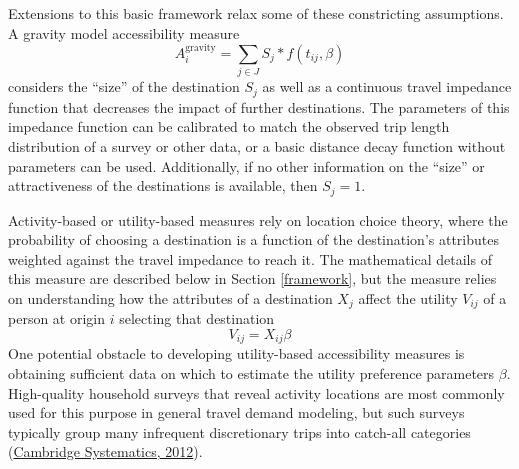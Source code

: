 \documentclass[3p, authoryear, review]{elsarticle} %
\begin{document}
Extensions to this basic framework relax some of these constricting assumptions.
A gravity model accessibility measure
\begin{equation}
  A_i^{\mathrm{gravity}} = \sum_{j \in J} S_j * f(t_{ij}, \beta)
  \label{eq:gravity}
\end{equation}
considers the ``size'' of the destination \(S_j\) as well as a continuous travel
impedance function that decreases the impact of further destinations. The parameters
of this impedance function can be calibrated to match the observed trip length
distribution of a survey or other data, or a basic distance decay function without
parameters can be used. Additionally, if no other information on the ``size'' or
attractiveness of the destinations is available, then \(S_j = 1\).

Activity-based or utility-based measures rely on location choice theory, where
the probability of choosing a destination is a function of the destination's
attributes weighted against the travel impedance to reach it. The mathematical
details of this measure are described below in Section \ref{framework}, but the
measure relies on understanding how the attributes of a destination \(X_j\) affect
the utility \(V_{ij}\) of a person at origin \(i\) selecting that destination
\begin{equation}
V_{ij} = X_{ij}\beta
  \label{eq:simple-utility}
\end{equation}
One potential obstacle to developing utility-based accessibility measures is
obtaining sufficient data on which to estimate the utility preference parameters \(\beta\).
High-quality household surveys that reveal activity locations are most commonly
used for this purpose in general travel demand modeling, but such surveys typically
group many infrequent discretionary trips into catch-all categories (\protect\hyperlink{ref-nchrp716}{Cambridge Systematics, 2012}).
\end{document}
